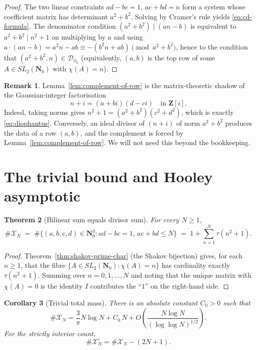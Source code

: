 \documentclass[11pt]{article}
\newtheorem{theorem}{Theorem}[section]
\newtheorem{corollary}[theorem]{Corollary}
\theoremstyle{definition}
\newtheorem{remark}[theorem]{Remark}
\newcommand{\Nz}{\mathbf{N}_0}
\newcommand{\Z}{\mathbf{Z}}
\newcommand{\SLNz}{SL_2(\Nz)}
\newcommand{\Dphi}{\mathcal{D}_{\phi_0}}
\begin{document}
\begin{proof}
The two linear constraints
$ad-bc=1$, $ac+bd=n$ form a system whose coefficient matrix has
determinant $a^{2}+b^{2}$. Solving by Cramer's rule yields
\eqref{eq:cd-formula}. The denominator condition $(a^{2}+b^{2})\mid(an-b)$
is equivalent to $a^{2}+b^{2}\mid n^{2}+1$ on multiplying by $a$ and using
$a\cdot(an-b)=a^{2}n-ab\equiv-(b^{2}n+ab)\pmod{a^{2}+b^{2}}$, hence to
the condition that $(a^{2}+b^{2},n)\in\Dphi$ (equivalently, $(a,b)$ is the
top row of some $A\in\SLNz$ with $\chi(A)=n$).
\end{proof}

\begin{remark}\label{rem:gaussian-restate}
Lemma~\ref{lem:complement-of-row} is the matrix-theoretic shadow of the
Gaussian-integer factorisation
\[
n+i=(a+bi)(d-ci)\quad\text{in }\Z[i].
\]
Indeed, taking norms gives $n^{2}+1=(a^{2}+b^{2})(c^{2}+d^{2})$, which is
exactly \eqref{eq:diophantus}. Conversely, an ideal divisor of $(n+i)$
of norm $a^{2}+b^{2}$ produces the data of a row $(a,b)$, and the
complement is forced by Lemma~\ref{lem:complement-of-row}. We will not
need this beyond the bookkeeping.
\end{remark}

\section{The trivial bound and Hooley asymptotic}\label{sec:trivial-bound}

\begin{theorem}[Bilinear sum equals divisor sum]
\label{thm:bilinear-equals-divisor-sum}
For every $N\ge 1$,
\begin{equation}\label{eq:total-mass}
\#\mathcal{X}_{N}\;=\;\#\{(a,b,c,d)\in\Nz^{4}:ad-bc=1,\,ac+bd\le N\}
\;=\;1+\sum_{n=1}^{N}\tau(n^{2}+1).
\end{equation}
\end{theorem}

\begin{proof}
Theorem~\ref{thm:shakov-prime-char} (the Shakov bijection) gives, for
each $n\ge 1$, that the fibre $\{A\in\SLNz:\chi(A)=n\}$ has cardinality
exactly $\tau(n^{2}+1)$. Summing over $n=0,1,\ldots,N$ and noting that
the unique matrix with $\chi(A)=0$ is the identity $I$ contributes the
``$1$'' on the right-hand side.
\end{proof}

\begin{corollary}[Trivial total mass]\label{cor:trivial-asymptotic}
There is an absolute constant $C_{0}>0$ such that
\[
\#\mathcal{X}_{N}=\frac{3}{\pi}N\log N
+C_{0}\,N+O\!\left(\frac{N\log N}{(\log\log N)^{1/2}}\right).
\]
For the strictly interior count,
\[
\#\mathcal{X}_{N}^{\circ}=\#\mathcal{X}_{N}-(2N+1).
\]
\end{corollary}
\end{document}
